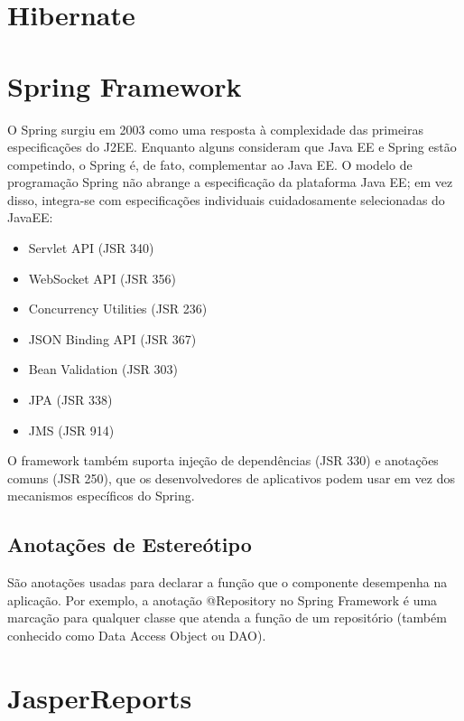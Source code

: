 \section{Hibernate}
\label{sec:embasamentoTeoricoHibernate}


\section{Spring Framework}
\label{sec:embasamentoTeoricoSpring}

O Spring surgiu em 2003 como uma resposta à complexidade das primeiras especificações do J2EE. Enquanto alguns consideram que Java EE e Spring estão competindo, o Spring é, de fato, complementar ao Java EE. O modelo de programação Spring não abrange a especificação da plataforma Java EE; em vez disso, integra-se com especificações individuais cuidadosamente selecionadas do JavaEE:

\begin{itemize}
    \item Servlet API (JSR 340)
    \item WebSocket API (JSR 356)
    \item Concurrency Utilities (JSR 236)
    \item JSON Binding API (JSR 367)
    \item Bean Validation (JSR 303)
    \item JPA (JSR 338)
    \item JMS (JSR 914)
\end{itemize}

O framework também suporta injeção de dependências (JSR 330)  e anotações comuns (JSR 250), que os desenvolvedores de aplicativos podem usar em vez dos mecanismos específicos do Spring.

\subsection{Anotações de Estereótipo}
São anotações usadas para declarar a função que o componente desempenha na aplicação. Por exemplo, a anotação @Repository no Spring Framework é uma marcação para qualquer classe que atenda a função de um repositório (também conhecido como Data Access Object ou DAO).

\section{JasperReports}
\label{sec:embasamentoTeoricoJasper}

